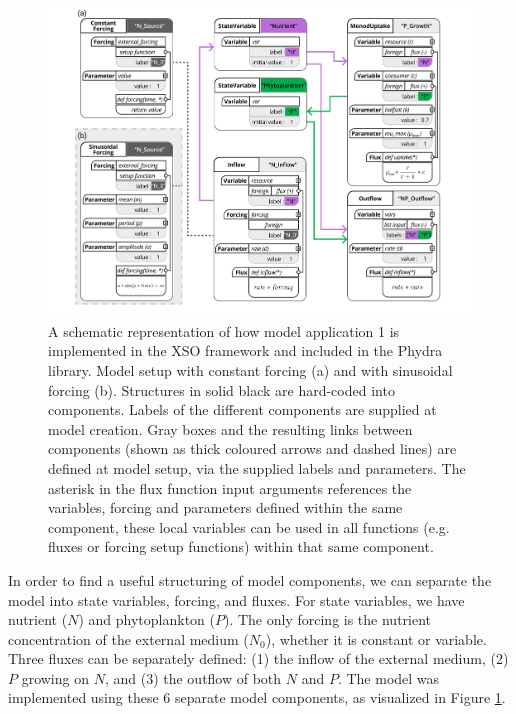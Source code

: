 \documentclass[journal abbreviation, manuscript]{copernicus}
\begin{document}
\begin{figure}[t]
\includegraphics[width=15cm]{Figures/firstdraft_schematics/code_schematics/Chemostat.pdf}
\caption{A schematic representation of how model application 1 is implemented in the XSO framework and included in the Phydra library. Model setup with constant forcing (a) and with sinusoidal forcing (b). Structures in solid black are hard-coded into components. Labels of the different components are supplied at model creation. Gray boxes and the resulting links between components (shown as thick coloured arrows and dashed lines) are defined at model setup, via the supplied labels and parameters. The asterisk in the flux function input arguments references the variables, forcing and parameters defined within the same component, these local variables can be used in all functions (e.g. fluxes or forcing setup functions) within that same component.}
\label{Figure:CodeSchematics_1}
\end{figure}

In order to find a useful structuring of model components, we can separate the model into state variables, forcing, and fluxes. For state variables, we have nutrient ($N$) and phytoplankton ($P$). The only forcing is the nutrient concentration of the external medium ($N_0$), whether it is constant or variable. Three fluxes can be separately defined: (1) the inflow of the external medium, (2) $P$ growing on $N$, and (3) the outflow of both $N$ and $P$. The model was implemented using these 6 separate model components, as visualized in Figure \ref{Figure:CodeSchematics_1}.
\end{document}
